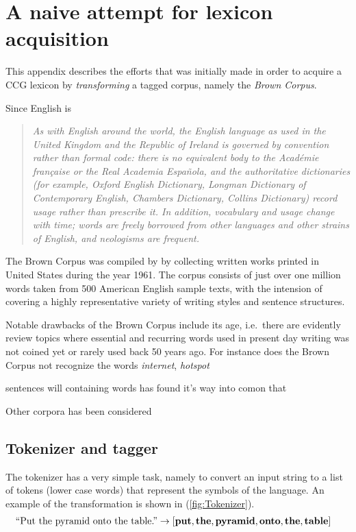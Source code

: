 \chapter{A naive attempt for lexicon acquisition}
\label{chap:brownCorpus}

This appendix describes the efforts that was initially made in order to acquire a CCG lexicon by \emph{transforming} a tagged corpus, namely the \emph{Brown Corpus}.

Since English is 
\begin{quote}
  \it As with English around the world, the English language as used in the United Kingdom and the Republic of Ireland is governed by convention rather than formal code: there is no equivalent body to the Académie française or the Real Academia Española, and the authoritative dictionaries (for example, Oxford English Dictionary, Longman Dictionary of Contemporary English, Chambers Dictionary, Collins Dictionary) record usage rather than prescribe it. In addition, vocabulary and usage change with time; words are freely borrowed from other languages and other strains of English, and neologisms are frequent.
\end{quote}

The Brown Corpus was compiled by \citeauthor{brown}  by collecting written works printed in United States during the year 1961. The corpus consists of just over one million words taken from 500 American English sample texts, with the intension of covering a highly representative variety of writing styles and sentence structures.

Notable drawbacks of the Brown Corpus include its age, i.e.\ there are evidently review topics where essential and recurring words used in present day writing was not coined yet or rarely used back 50 years ago. For instance does the Brown Corpus not recognize the words \emph{internet}, \emph{hotspot}

   sentences will containing words has found it's way into comon  that 

Other corpora has been considered
\cite{cs}

\section{Tokenizer and tagger}
The tokenizer has a very simple task, namely to convert an input string to a list of tokens (lower case words) that represent the symbols of the language. An example of the transformation is shown in
(\ref{fig:Tokenizer}).
\begin{align}
  &\text{``Put the pyramid onto the table.''} \to 
  \left[ 
  \mathbf{put}, \mathbf{the}, \mathbf{pyramid}, \mathbf{onto}, \mathbf{the}, \mathbf{table} 
  \right] 
  \label{fig:Tokenizer}
\end{align}

